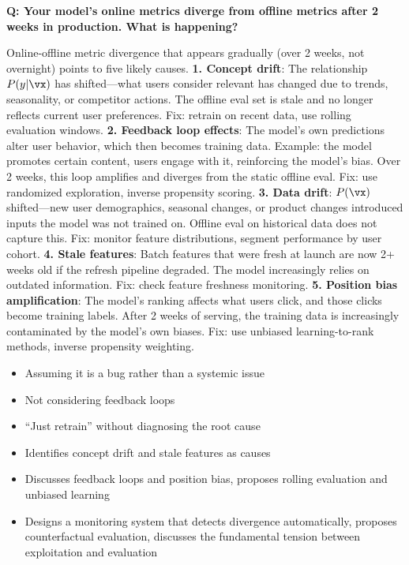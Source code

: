 \begin{interviewq}
\textbf{Q: Your model's online metrics diverge from offline metrics after 2 weeks in production. What is happening?}

 \quad {} \quad \badgefreq{\freqhigh}

\stronganswer Online-offline metric divergence that appears gradually (over 2 weeks, not overnight) points to five likely causes. \textbf{1. Concept drift}: The relationship $P(y|\vx)$ has shifted---what users consider relevant has changed due to trends, seasonality, or competitor actions. The offline eval set is stale and no longer reflects current user preferences. Fix: retrain on recent data, use rolling evaluation windows. \textbf{2. Feedback loop effects}: The model's own predictions alter user behavior, which then becomes training data. Example: the model promotes certain content, users engage with it, reinforcing the model's bias. Over 2 weeks, this loop amplifies and diverges from the static offline eval. Fix: use randomized exploration, inverse propensity scoring. \textbf{3. Data drift}: $P(\vx)$ shifted---new user demographics, seasonal changes, or product changes introduced inputs the model was not trained on. Offline eval on historical data does not capture this. Fix: monitor feature distributions, segment performance by user cohort. \textbf{4. Stale features}: Batch features that were fresh at launch are now 2+ weeks old if the refresh pipeline degraded. The model increasingly relies on outdated information. Fix: check feature freshness monitoring. \textbf{5. Position bias amplification}: The model's ranking affects what users click, and those clicks become training labels. After 2 weeks of serving, the training data is increasingly contaminated by the model's own biases. Fix: use unbiased learning-to-rank methods, inverse propensity weighting.

\redflags
\begin{itemize}
    \item Assuming it is a bug rather than a systemic issue
    \item Not considering feedback loops
    \item ``Just retrain'' without diagnosing the root cause
\end{itemize}


\goodgreat
\begin{itemize}
    \item {} Identifies concept drift and stale features as causes
    \item {} Discusses feedback loops and position bias, proposes rolling evaluation and unbiased learning
    \item {} Designs a monitoring system that detects divergence automatically, proposes counterfactual evaluation, discusses the fundamental tension between exploitation and evaluation
\end{itemize}


\end{interviewq}

